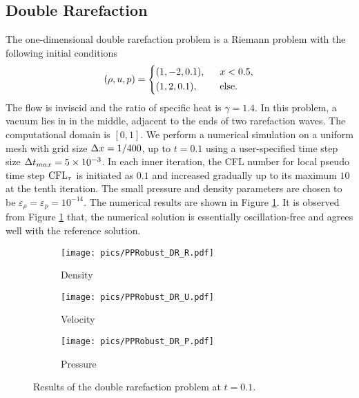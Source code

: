 \subsection{Double Rarefaction}

The one-dimensional double rarefaction problem \cite{hu2004kineticDoubleRare}
is a Riemann problem with the following initial conditions
\begin{equation}
    (\rho,u,p) = \begin{dcases}
        (1,-2,0.1),\ \  & x < 0.5,       \\
        (1,2,0.1),\ \   & \mathrm{else}.
    \end{dcases}
\end{equation}
The flow is inviscid and the ratio of specific heat is $\gamma=1.4$.
In this problem, a vacuum lies in in the middle, adjacent to the ends of two rarefaction waves.
The computational domain is $[0,1]$.
We perform a numerical simulation on a uniform mesh with grid size $\mathrm\Delta x = 1/400$, up to $t=0.1$ using a user-specified time step size $\mathrm\Delta t_{max}= 5 \times 10 ^{-3}$.
In each inner iteration, the CFL number for local pseudo time step $\text{CFL}_\tau$ is initiated as $0.1$ and
increased gradually up to its maximum $10$ at the tenth iteration.
The small pressure and density parameters are chosen to be $\varepsilon_\rho = \varepsilon_p = 10^{-14}$.
The numerical results are shown in Figure \ref{fig:doubleRare}. It is observed from Figure \ref{fig:doubleRare} that, the numerical solution is essentially oscillation-free and agrees well with the reference solution.

\begin{figure}[htbp]
    \centering
    \begin{subfigure}{0.33\textwidth}
        \texttt{[image: pics/PPRobust\_DR\_R.pdf]}
        \caption[]{Density}
    \end{subfigure}\hfill
    \begin{subfigure}{0.33\textwidth}
        \texttt{[image: pics/PPRobust\_DR\_U.pdf]}
        \caption[]{Velocity}
    \end{subfigure}\hfill
    \begin{subfigure}{0.33\textwidth}
        \texttt{[image: pics/PPRobust\_DR\_P.pdf]}
        \caption[]{Pressure}
    \end{subfigure}
    \caption{Results of the double rarefaction problem at $t=0.1$.}
    \label{fig:doubleRare}
\end{figure}

